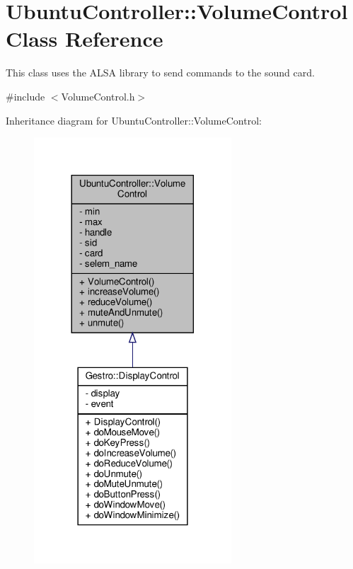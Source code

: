 \hypertarget{class_ubuntu_controller_1_1_volume_control}{}\section{Ubuntu\+Controller\+:\+:Volume\+Control Class Reference}
\label{class_ubuntu_controller_1_1_volume_control}


This class uses the A\+L\+SA library to send commands to the sound card.  




{\ttfamily \#include $<$Volume\+Control.\+h$>$}



Inheritance diagram for Ubuntu\+Controller\+:\+:Volume\+Control\+:
\nopagebreak
\begin{figure}[H]
\begin{center}
\leavevmode
\includegraphics[width=209pt]{class_ubuntu_controller_1_1_volume_control__inherit__graph}
\end{center}
\end{figure}


